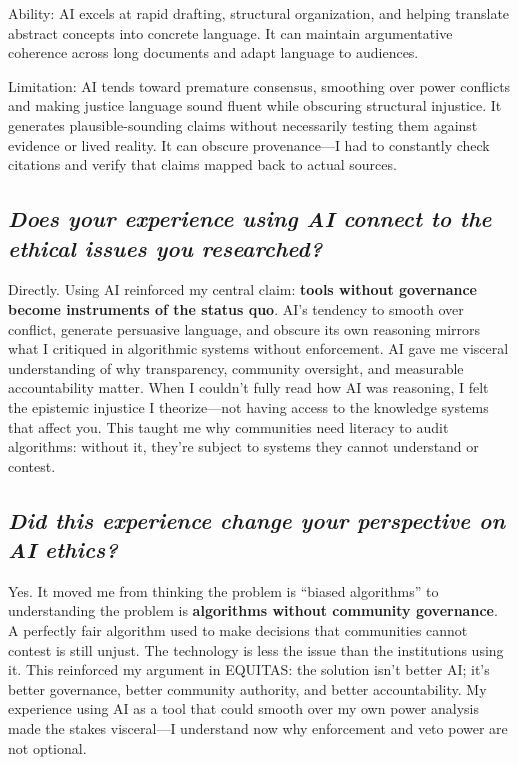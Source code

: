 \documentclass[12pt,a4paper]{article}
\begin{document}
Ability: AI excels at rapid drafting, structural organization, and helping translate abstract concepts into concrete language. It can maintain argumentative coherence across long documents and adapt language to audiences.

Limitation: AI tends toward premature consensus, smoothing over power conflicts and making justice language sound fluent while obscuring structural injustice. It generates plausible-sounding claims without necessarily testing them against evidence or lived reality. It can obscure provenance—I had to constantly check citations and verify that claims mapped back to actual sources.

\subsection*{\textit{Does your experience using AI connect to the ethical issues you researched?}}

Directly. Using AI reinforced my central claim: \textbf{tools without governance become instruments of the status quo}. AI's tendency to smooth over conflict, generate persuasive language, and obscure its own reasoning mirrors what I critiqued in algorithmic systems without enforcement. AI gave me visceral understanding of why transparency, community oversight, and measurable accountability matter. When I couldn't fully read how AI was reasoning, I felt the epistemic injustice I theorize—not having access to the knowledge systems that affect you. This taught me why communities need literacy to audit algorithms: without it, they're subject to systems they cannot understand or contest.

\subsection*{\textit{Did this experience change your perspective on AI ethics?}}

Yes. It moved me from thinking the problem is ``biased algorithms'' to understanding the problem is \textbf{algorithms without community governance}. A perfectly fair algorithm used to make decisions that communities cannot contest is still unjust. The technology is less the issue than the institutions using it. This reinforced my argument in EQUITAS: the solution isn't better AI; it's better governance, better community authority, and better accountability. My experience using AI as a tool that could smooth over my own power analysis made the stakes visceral—I understand now why enforcement and veto power are not optional.
\end{document}
